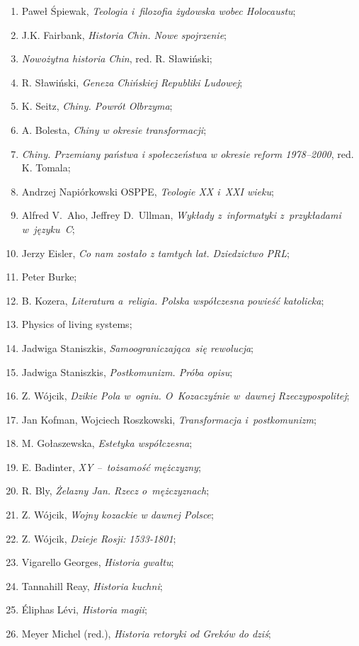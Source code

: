 \documentclass[a4paper,11pt]{article}
\begin{document}
\begin{enumerate}
\item Paweł Śpiewak, \emph{Teologia i~filozofia żydowska wobec
    Holocaustu};
\item J.K. Fairbank, \emph{Historia Chin. Nowe spojrzenie};
\item \emph{Nowożytna historia Chin}, red. R. Sławiński;
\item R. Sławiński, \emph{Geneza Chińskiej Republiki Ludowej};
\item K. Seitz, \emph{Chiny. Powrót Olbrzyma};
\item A. Bolesta, \emph{Chiny w okresie transformacji};
\item \emph{Chiny. Przemiany państwa i społeczeństwa w okresie reform
    1978--2000}, red. K. Tomala;
\item Andrzej Napiórkowski OSPPE, \emph{Teologie XX i~XXI wieku};
\item Alfred V.~Aho, Jeffrey D.~Ullman, \emph{Wykłady z~informatyki
    z~przykładami w~języku~C};
\item Jerzy Eisler, \emph{Co nam zostało z tamtych lat. Dziedzictwo
    PRL};
\item Peter Burke;
\item B. Kozera, \emph{Literatura a~religia. Polska współczesna
    powieść katolicka};
\item Physics of living systems;
\item Jadwiga Staniszkis, \emph{Samoograniczająca~się rewolucja};
\item Jadwiga Staniszkis, \emph{Postkomunizm. Próba opisu};
\item Z. Wójcik, \emph{Dzikie Pola w~ogniu. O~Kozaczyźnie w~dawnej
    Rzeczypospolitej};
\item Jan Kofman, Wojciech Roszkowski, \emph{Transformacja
    i~postkomunizm};
\item M. Gołaszewska, \emph{Estetyka współczesna};
\item E. Badinter, \emph{XY --~tożsamość mężczyzny};
\item R. Bly, \emph{Żelazny Jan. Rzecz o~mężczyznach};
\item Z. Wójcik, \emph{Wojny kozackie w dawnej Polsce};
\item Z. Wójcik, \emph{Dzieje Rosji: 1533-1801};
\item Vigarello Georges, \emph{Historia gwałtu};
\item Tannahill Reay, \emph{Historia kuchni};
\item Éliphas Lévi, \emph{Historia magii};
\item Meyer Michel (red.), \emph{Historia retoryki od Greków do dziś};

\end{enumerate}
\end{document}
